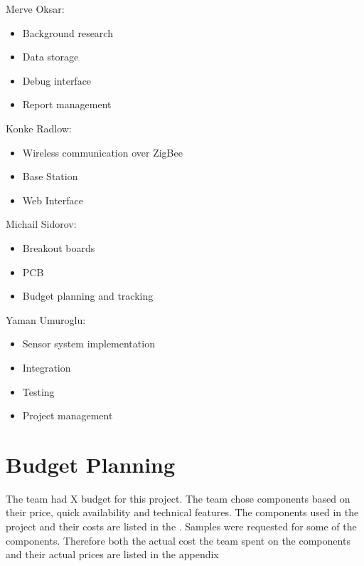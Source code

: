 Merve Oksar:
\begin{itemize}
\item Background research
\item Data storage
\item Debug interface
\item Report management
\end{itemize}

Konke Radlow:
\begin{itemize}
\item Wireless communication over ZigBee
\item Base Station
\item Web Interface
\end{itemize}

Michail Sidorov:
\begin{itemize}
\item Breakout boards
\item PCB 
\item Budget planning and tracking
\end{itemize}

Yaman Umuroglu: 
\begin{itemize}
\item Sensor system implementation
\item Integration
\item Testing
\item Project management 
\end{itemize}


\section{Budget Planning}
The team had X budget for this project. The team chose components based on their price, quick availability and technical features. The components used in the project and their costs are listed in the . Samples were requested for some of the components. Therefore both the actual cost the team spent on the components and their actual prices are listed in the appendix 